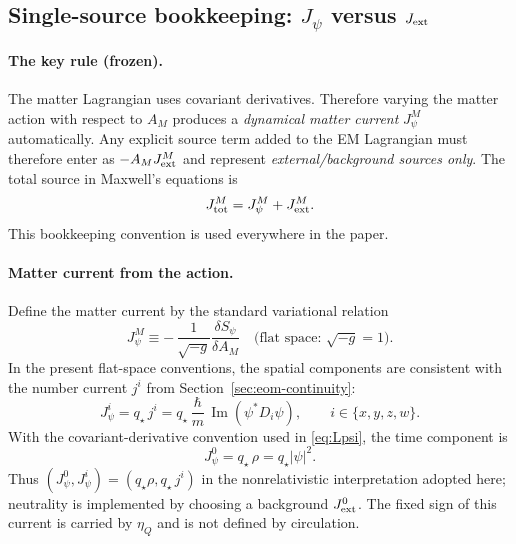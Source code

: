 \documentclass[11pt]{article}
\newcommand{\etaQ}{\eta_Q}
\newcommand{\qstar}{q_\star}
\begin{document}
\subsection{Single-source bookkeeping: \texorpdfstring{$J_\psi$}{Jpsi} versus \texorpdfstring{$J_{\rm ext}$}{Jext}}
\label{app:source-bookkeeping}

\paragraph{The key rule (frozen).}
The matter Lagrangian uses covariant derivatives. Therefore varying the matter action with respect to $A_M$ produces a \emph{dynamical matter current} $J_\psi^M$ automatically. Any explicit source term added to the EM Lagrangian must therefore enter as $-A_M J_{\rm ext}^M$ and represent \emph{external/background sources only}. The total source in Maxwell's equations is
\begin{equation}
J_{\rm tot}^M = J_\psi^M + J_{\rm ext}^M.
\end{equation}
This bookkeeping convention is used everywhere in the paper.

\paragraph{Matter current from the action.}
Define the matter current by the standard variational relation
\begin{equation}
\boxed{
J_\psi^M \equiv -\,\frac{1}{\sqrt{-g}}\frac{\delta S_\psi}{\delta A_M}
\quad \text{(flat space: } \sqrt{-g}=1\text{)}.
}
\label{eq:Jpsi-variational}
\end{equation}
In the present flat-space conventions, the spatial components are consistent with the number current $j^i$ from Section~\ref{sec:eom-continuity}:
\begin{equation}
J_\psi^i = \qstar\,j^i
=
\qstar\,\frac{\hbar}{m}\,\operatorname{Im}\!\left(\psi^*D_i\psi\right),
\qquad i\in\{x,y,z,w\}.
\label{eq:Jpsi-spatial}
\end{equation}
With the covariant-derivative convention used in \eqref{eq:Lpsi}, the time component is
\begin{equation}
J_\psi^0 = \qstar\,\rho = \qstar|\psi|^2.
\label{eq:Jpsi-time}
\end{equation}
Thus $(J_\psi^0,J_\psi^i)=(\qstar\rho, \qstar\,j^i)$ in the nonrelativistic interpretation adopted here; neutrality is implemented by choosing a background $J_{\rm ext}^0$. The fixed sign of this current is carried by $\etaQ$ and is not defined by circulation.
\end{document}
